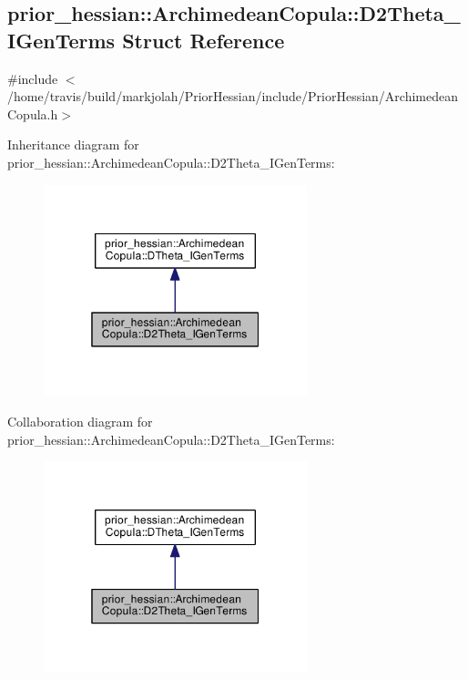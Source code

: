 \hypertarget{structprior__hessian_1_1ArchimedeanCopula_1_1D2Theta__IGenTerms}{}\subsection{prior\+\_\+hessian\+:\+:Archimedean\+Copula\+:\+:D2\+Theta\+\_\+\+I\+Gen\+Terms Struct Reference}
\label{structprior__hessian_1_1ArchimedeanCopula_1_1D2Theta__IGenTerms}


{\ttfamily \#include $<$/home/travis/build/markjolah/\+Prior\+Hessian/include/\+Prior\+Hessian/\+Archimedean\+Copula.\+h$>$}



Inheritance diagram for prior\+\_\+hessian\+:\+:Archimedean\+Copula\+:\+:D2\+Theta\+\_\+\+I\+Gen\+Terms\+:\nopagebreak
\begin{figure}[H]
\begin{center}
\leavevmode
\includegraphics[width=217pt]{structprior__hessian_1_1ArchimedeanCopula_1_1D2Theta__IGenTerms__inherit__graph}
\end{center}
\end{figure}


Collaboration diagram for prior\+\_\+hessian\+:\+:Archimedean\+Copula\+:\+:D2\+Theta\+\_\+\+I\+Gen\+Terms\+:\nopagebreak
\begin{figure}[H]
\begin{center}
\leavevmode
\includegraphics[width=217pt]{structprior__hessian_1_1ArchimedeanCopula_1_1D2Theta__IGenTerms__coll__graph}
\end{center}
\end{figure}
